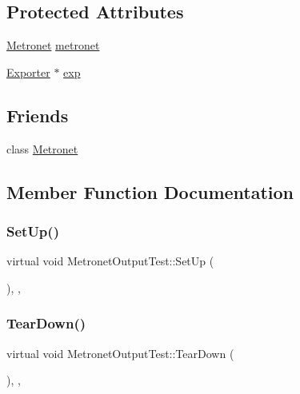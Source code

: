 \subsection*{Protected Attributes}
\begin{DoxyCompactItemize}
\item 
\hyperlink{class_metronet}{Metronet} \hyperlink{class_metronet_output_test_aaa6f34ee762d128cd8aea8c895bb46e4}{metronet}
\item 
\hyperlink{class_exporter}{Exporter} $\ast$ \hyperlink{class_metronet_output_test_ace0d26029b129b05d3846365c56d42ee}{exp}
\end{DoxyCompactItemize}
\subsection*{Friends}
\begin{DoxyCompactItemize}
\item 
class \hyperlink{class_metronet_output_test_a07c94fb69880743e62f64a941fc2d4ab}{Metronet}
\end{DoxyCompactItemize}


\subsection{Member Function Documentation}
\mbox{\label{class_metronet_output_test_a591685e65362fe63b325e2d33189a3b0}} 
\subsubsection{\texorpdfstring{Set\+Up()}{SetUp()}}
{\footnotesize\ttfamily virtual void Metronet\+Output\+Test\+::\+Set\+Up (\begin{DoxyParamCaption}{ }\end{DoxyParamCaption})\hspace{0.3cm}{\ttfamily [inline]}, {\ttfamily [protected]}, {\ttfamily [virtual]}}

\mbox{\label{class_metronet_output_test_a1390ab64ffdb3c5da39c4b27b40c170a}} 
\subsubsection{\texorpdfstring{Tear\+Down()}{TearDown()}}
{\footnotesize\ttfamily virtual void Metronet\+Output\+Test\+::\+Tear\+Down (\begin{DoxyParamCaption}{ }\end{DoxyParamCaption})\hspace{0.3cm}{\ttfamily [inline]}, {\ttfamily [protected]}, {\ttfamily [virtual]}}



